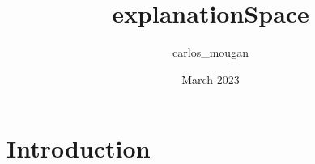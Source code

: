 \documentclass{article}
\title{explanationSpace}
\author{carlos_mougan }
\date{March 2023}
\begin{document}
\maketitle

\section{Introduction}
\end{document}
